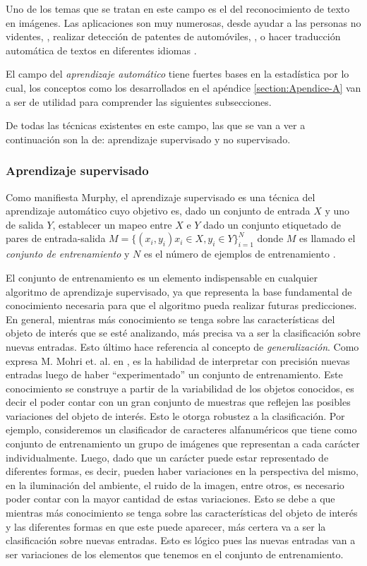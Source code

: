 	Uno de los temas que se tratan en este campo es el del reconocimiento de texto en imágenes. Las aplicaciones son muy numerosas, desde ayudar a las personas no videntes, \cite{Optelec}, realizar detección de patentes de automóviles, \cite{DAB}, o hacer traducción automática de textos en diferentes idiomas \cite{WordLens}.
	 
	 El campo del \textit{aprendizaje automático} tiene fuertes bases en la estadística por lo cual, los conceptos como los desarrollados en el apéndice \ref{section:Apendice-A} van a ser de utilidad para comprender las siguientes subsecciones.
	 
	 De todas las técnicas existentes en este campo, las que se van a ver a continuación son la de: aprendizaje supervisado y no supervisado.
	 	
	\subsubsection{Aprendizaje supervisado}
	
	Como manifiesta Murphy, el aprendizaje supervisado es una técnica del aprendizaje automático cuyo objetivo es, dado un conjunto de entrada $X$ y uno de salida $Y$, establecer un mapeo entre $X$ e $Y$ dado un conjunto etiquetado de pares de entrada-salida $M=\{(x_i,y_i) x_i \in X, y_i \in Y \}^{N}_{i=1}$ donde $M$ es llamado el \textit{conjunto de entrenamiento} y $N$ es el número de ejemplos de entrenamiento \cite{Murphy12}.
	
	El conjunto de entrenamiento es un elemento indispensable en cualquier algoritmo de aprendizaje supervisado, ya que representa la base fundamental de conocimiento necesaria para que el algoritmo pueda realizar futuras predicciones. En general, mientras más conocimiento se tenga sobre las características del objeto de interés que se esté analizando, más precisa va a ser la clasificación sobre nuevas entradas. Esto último hace referencia al concepto de \textit{generalización}. Como expresa M. Mohri et. al. en \cite{MMohri}, es la habilidad de interpretar con precisión nuevas entradas luego de haber ``experimentado'' un conjunto de entrenamiento. Este conocimiento se construye a partir de la variabilidad de los objetos conocidos, es decir el poder contar con un gran conjunto de muestras que reflejen las posibles variaciones del objeto de interés. Esto le otorga robustez a la clasificación. Por ejemplo, consideremos un clasificador de caracteres alfanuméricos que tiene como conjunto de entrenamiento un grupo de imágenes que representan a cada carácter individualmente. Luego, dado que un carácter puede estar representado de diferentes formas, es decir, pueden haber variaciones en la perspectiva del mismo, en la iluminación del ambiente, el ruido de la imagen, entre otros, es necesario poder contar con la mayor cantidad de estas variaciones. Esto se debe a que mientras más conocimiento se tenga sobre las características del objeto de interés y las diferentes formas en que este puede aparecer, más certera va a ser la clasificación sobre nuevas entradas. Esto es lógico pues las nuevas entradas van a ser variaciones de los elementos que tenemos en el conjunto de entrenamiento.
	
